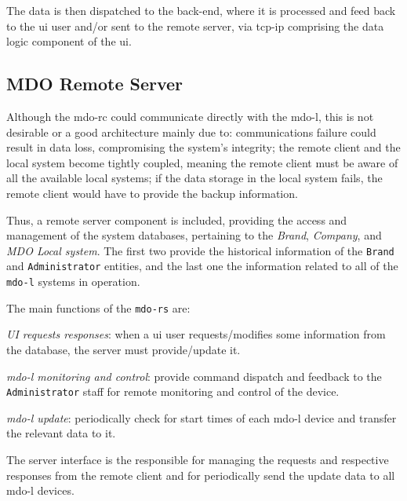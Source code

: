 The data is then dispatched to the back-end, where it is processed and feed back
to the \gls{ui} user and/or sent to the remote server, via \gls{tcp-ip}
comprising the data logic component of the \gls{ui}.
%
%
\subsection{MDO Remote Server}
\label{sec:mdo-remote-server}
Although the \gls{mdo-rc} could communicate directly with the \gls{mdo-l}, this
is not desirable or a good architecture mainly due to: communications failure could
result in data loss, compromising the system's integrity; the remote client and
the local system become tightly coupled, meaning the remote client must be aware
of all the available local systems; if the data storage in the local system
fails, the remote client would have to provide the backup information.

Thus, a remote server component is included, providing the access and management
of the system databases, pertaining to the \emph{Brand}, \emph{Company}, and
\emph{MDO Local system}. The first two provide the historical information of the
\texttt{Brand} and \texttt{Administrator} entities, and the last one the information
related to all of the \texttt{\gls{mdo-l}} systems in operation.

The main functions of the \texttt{\gls{mdo-rs}} are:
\begin{item-c}
\item \emph{UI requests responses}: when a \gls{ui} user requests/modifies
  some information from the database, the server must provide/update it.
\item \emph{\gls{mdo-l} monitoring and control}: provide command dispatch and
  feedback to the \texttt{Administrator} staff for remote monitoring and control of
  the device.
\item \emph{\gls{mdo-l} update}: periodically check for start times of each
  \gls{mdo-l} device and transfer the relevant data to it.
\end{item-c}

The server interface is the responsible for managing the requests and respective
responses from the remote client and for periodically send the update data to
all \gls{mdo-l} devices. 
%
%
